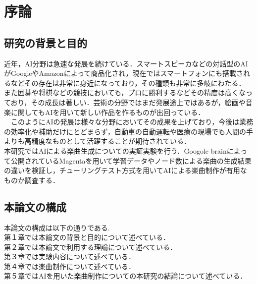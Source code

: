 \chapter{序論}

\section{研究の背景と目的}
近年，AI分野は急速な発展を続けている．スマートスピーカなどの対話型のAIがGoogleやAmazonによって商品化され，現在ではスマートフォンにも搭載されるなどその存在は非常に身近になっており，その種類も非常に多岐にわたる．\\
また囲碁や将棋などの競技においても，プロに勝利するなどその精度は高くなっており，その成長は著しい．芸術の分野ではまだ発展途上ではあるが，絵画や音楽に関してもAIを用いて新しい作品を作るものが出回っている．\\
　このようにAIの発展は様々な分野においてその成果を上げており，今後は業務の効率化や補助だけにとどまらず，自動車の自動運転や医療の現場でも人間の手よりも高精度なものとして活躍することが期待されている．\\
本研究ではAIによる楽曲生成についての実証実験を行う．Googole brainによって公開されているMagentaを用いて学習データやノード数による楽曲の生成結果の違いを検証し，チューリングテスト方式を用いてAIによる楽曲制作が有用なものか調査する．\\



\section{本論文の構成}
本論文の構成は以下の通りである.\\
第１章では本論文の背景と目的について述べている．\\
第２章では本論文で利用する理論について述べている．\\
第３章では実験内容について述べている．\\
第４章では楽曲制作について述べている．\\
第５章ではAIを用いた楽曲制作についての本研究の結論について述べている．\\
